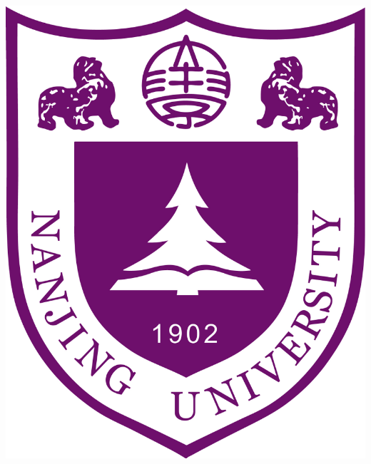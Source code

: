 \documentclass[a0,portrait]{a0poster}
\begin{document}
\begin{minipage}[c]{0.12\linewidth}
\begin{center}
\includegraphics[width=\linewidth]{NJU.pdf}
\end{center}
\end{minipage}

\vspace{1cm} %
\end{document}
